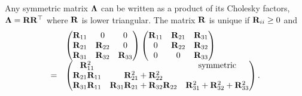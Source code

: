 	
Any symmetric matrix ${\boldsymbol \Lambda}$ can be written as a product of its Cholesky factors, ${\boldsymbol \Lambda} = {\bf R}
{\bf R}^\top$ where ${\bf R}$ is lower triangular. The matrix ${\bf R}$ is unique if ${\bf R}_{ii}
\geq 0$ and
\begin{equation*}
\label{eq:cholesky_factorisation}
\begin{array}{lll}
	&\begin{pmatrix}
	{\bf R}_{11}          & 0                                    & 0                                     \\
	{\bf R}_{21}          & {\bf R}_{22}                             & 0                                     \\
	{\bf R}_{31}          & {\bf R}_{32}                             & {\bf R}_{33}                              
	\end{pmatrix}
	\begin{pmatrix}
	{\bf R}_{11}          & {\bf R}_{21}                             & {\bf R}_{31}                              \\
	0                 & {\bf R}_{22}                             & {\bf R}_{32}                              \\
	0                 & 0                                    & {\bf R}_{33}                              
	\end{pmatrix}
	\\
	=& \begin{pmatrix}
	{\bf R}_{11}^2        &                                      & \text{symmetric}                      \\
	{\bf R}_{21}{\bf R}_{11} & {\bf R}_{21}^2 + {\bf R}_{22}^2 \\
	{\bf R}_{31} {\bf R}_{11} & {\bf R}_{31}{\bf R}_{21} + {\bf R}_{32} {\bf R}_{22} & {\bf R}_{31}^2 + {\bf R}_{32} ^2 + {\bf R}_{33}^2 
	\end{pmatrix}.
\end{array}
\end{equation*}

